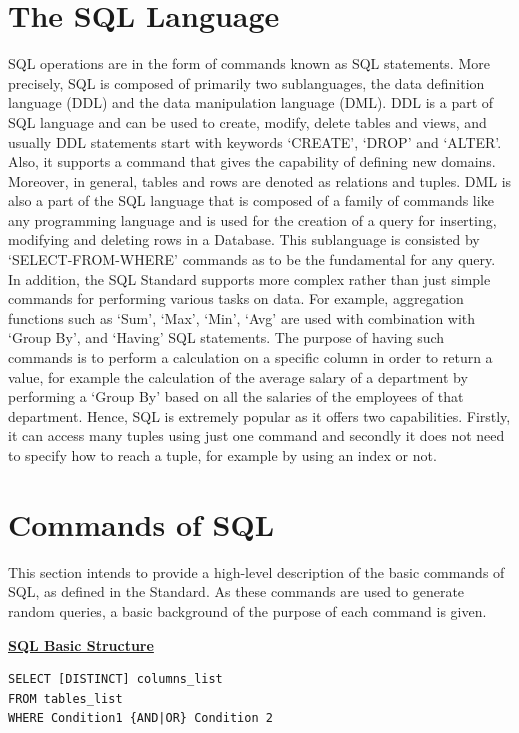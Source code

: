 \section{The SQL Language}
SQL operations are in the form of commands known as SQL statements. More precisely, SQL is composed of primarily two sublanguages, the data definition language (DDL) and the data manipulation language (DML). DDL is a part of SQL language and can be used to create, modify, delete tables and views, and usually DDL statements start with keywords ‘CREATE’, ‘DROP’ and ‘ALTER’. Also, it supports a command that gives the capability of defining new domains. Moreover, in general, tables and rows are denoted as relations and tuples. DML is also a part of the SQL language that is composed of a family of commands like any programming language and is used for the creation of a query for inserting, modifying and deleting rows in a Database. This sublanguage is consisted by ‘SELECT-FROM-WHERE’ commands as to be the fundamental for any query. In addition, the SQL Standard supports more complex rather than just simple commands for performing various tasks on data. For example, aggregation functions such as ‘Sum’, ‘Max’, ‘Min’, ‘Avg’ are used with combination with ‘Group By’, and ‘Having’ SQL statements. The purpose of having such commands is to perform a calculation on a specific column in order to return a value, for example the calculation of the average salary of a department by performing a ‘Group By’ based on all the salaries of the employees of that department. 
Hence, SQL is extremely popular as it offers two capabilities. Firstly, it can access many tuples using just one command and secondly it does not need to specify how to reach a tuple, for example by using an index or not. 

\section{Commands of SQL}
This section intends to provide a high-level description of the basic commands of SQL, as defined in the Standard. As these commands are used to generate random queries, a basic background of the purpose of each command is given.

\hfill\newline
\noindent\textbf{\underline{SQL Basic Structure}} 
\begin{mdframed}[nobreak=true, backgroundcolor=lightgray!20] 
\begin{lstlisting}[style=SQL]
SELECT [DISTINCT] columns_list
FROM tables_list
WHERE Condition1 {AND|OR} Condition 2
\end{lstlisting}
\end{mdframed}
 
